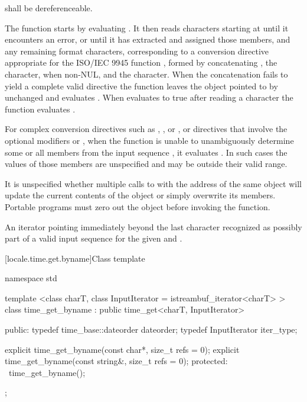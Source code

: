 \begin{itemdescr}
\pnum
\requires
{} shall be dereferenceable.

\pnum
\effects The function starts by evaluating
. It
then reads characters starting at  until it encounters an error, or
until it has extracted and assigned those  members, and any
remaining format characters, corresponding to a conversion directive
appropriate for the ISO/IEC 9945 function , formed by
concatenating , the  character,
when non-NUL, and the 
character. When the concatenation fails to yield a complete valid
directive the function leaves the object pointed to by  unchanged and
evaluates . When 
evaluates to true after reading a character the function evaluates
.

\pnum
For complex conversion directives such as ,
, or , or directives
that involve the optional modifiers  or ,
when the function is unable
to unambiguously determine some or all  members from the input
sequence , it evaluates .
In such cases the values of those  members are unspecified
and may be outside their valid range.

\pnum
\note It is unspecified whether multiple calls to
 with the
address of the same  object will update the current contents of
the object or simply overwrite its members. Portable programs must zero
out the object before invoking the function.

\pnum
\returns An iterator pointing immediately beyond the last character
recognized as possibly part of a valid input sequence for the given
 and .
\end{itemdescr}

[locale.time.get.byname]{Class template }

%
\begin{codeblock}
namespace std {
  template <class charT, class InputIterator = istreambuf_iterator<charT> >
  class time_get_byname : public time_get<charT, InputIterator> {
  public:
    typedef time_base::dateorder dateorder;
    typedef InputIterator        iter_type;

    explicit time_get_byname(const char*, size_t refs = 0);
    explicit time_get_byname(const string&, size_t refs = 0);
  protected:
    ~time_get_byname();
  };
}
\end{codeblock}

